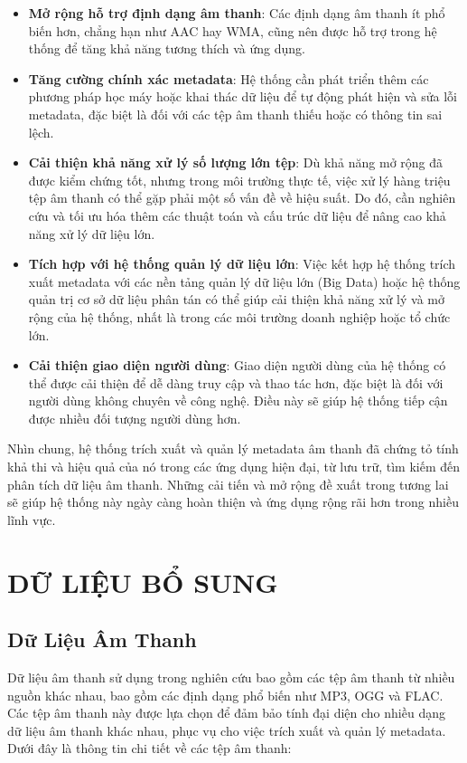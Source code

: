 \documentclass[conference]{IEEEtran}
\begin{document}
\begin{itemize}
    \item \textbf{Mở rộng hỗ trợ định dạng âm thanh}: Các định dạng âm thanh ít phổ biến hơn, chẳng hạn như AAC hay WMA, cũng nên được hỗ trợ trong hệ thống để tăng khả năng tương thích và ứng dụng.
    \item \textbf{Tăng cường chính xác metadata}: Hệ thống cần phát triển thêm các phương pháp học máy hoặc khai thác dữ liệu để tự động phát hiện và sửa lỗi metadata, đặc biệt là đối với các tệp âm thanh thiếu hoặc có thông tin sai lệch.
    \item \textbf{Cải thiện khả năng xử lý số lượng lớn tệp}: Dù khả năng mở rộng đã được kiểm chứng tốt, nhưng trong môi trường thực tế, việc xử lý hàng triệu tệp âm thanh có thể gặp phải một số vấn đề về hiệu suất. Do đó, cần nghiên cứu và tối ưu hóa thêm các thuật toán và cấu trúc dữ liệu để nâng cao khả năng xử lý dữ liệu lớn.
    \item \textbf{Tích hợp với hệ thống quản lý dữ liệu lớn}: Việc kết hợp hệ thống trích xuất metadata với các nền tảng quản lý dữ liệu lớn (Big Data) hoặc hệ thống quản trị cơ sở dữ liệu phân tán có thể giúp cải thiện khả năng xử lý và mở rộng của hệ thống, nhất là trong các môi trường doanh nghiệp hoặc tổ chức lớn.
    \item \textbf{Cải thiện giao diện người dùng}: Giao diện người dùng của hệ thống có thể được cải thiện để dễ dàng truy cập và thao tác hơn, đặc biệt là đối với người dùng không chuyên về công nghệ. Điều này sẽ giúp hệ thống tiếp cận được nhiều đối tượng người dùng hơn.
\end{itemize}

Nhìn chung, hệ thống trích xuất và quản lý metadata âm thanh đã chứng tỏ tính khả thi và hiệu quả của nó trong các ứng dụng hiện đại, từ lưu trữ, tìm kiếm đến phân tích dữ liệu âm thanh. Những cải tiến và mở rộng đề xuất trong tương lai sẽ giúp hệ thống này ngày càng hoàn thiện và ứng dụng rộng rãi hơn trong nhiều lĩnh vực.


\section{DỮ LIỆU BỔ SUNG}

\subsection{Dữ Liệu Âm Thanh}
Dữ liệu âm thanh sử dụng trong nghiên cứu bao gồm các tệp âm thanh từ nhiều nguồn khác nhau, bao gồm các định dạng phổ biến như MP3, OGG và FLAC. Các tệp âm thanh này được lựa chọn để đảm bảo tính đại diện cho nhiều dạng dữ liệu âm thanh khác nhau, phục vụ cho việc trích xuất và quản lý metadata. Dưới đây là thông tin chi tiết về các tệp âm thanh:
\end{document}
